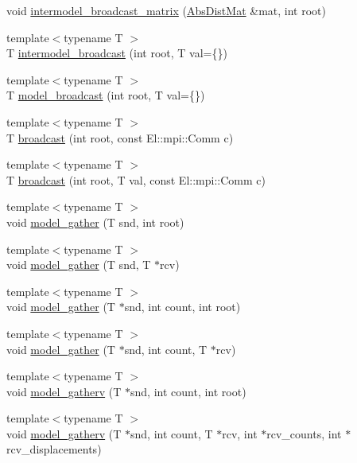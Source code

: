 \begin{DoxyCompactItemize}
void \hyperlink{classlbann_1_1lbann__comm_a7fb6be066a634169cb41cef3f98032f0}{intermodel\+\_\+broadcast\+\_\+matrix} (\hyperlink{base_8hpp_a9a697a504ae84010e7439ffec862b470}{Abs\+Dist\+Mat} \&mat, int root)
\item 
{\footnotesize template$<$typename T $>$ }\\T \hyperlink{classlbann_1_1lbann__comm_a158db6a85549d314be56806dcb442432}{intermodel\+\_\+broadcast} (int root, T val=\{\})
\item 
{\footnotesize template$<$typename T $>$ }\\T \hyperlink{classlbann_1_1lbann__comm_a929f44a9a9563ae9e4ffe7d44235a195}{model\+\_\+broadcast} (int root, T val=\{\})
\item 
{\footnotesize template$<$typename T $>$ }\\T \hyperlink{classlbann_1_1lbann__comm_af823b7ca3caccbd0710cd1435e60506b}{broadcast} (int root, const El\+::mpi\+::\+Comm c)
\item 
{\footnotesize template$<$typename T $>$ }\\T \hyperlink{classlbann_1_1lbann__comm_a34bb0766e57fda27e6618c9e66fec269}{broadcast} (int root, T val, const El\+::mpi\+::\+Comm c)
\item 
{\footnotesize template$<$typename T $>$ }\\void \hyperlink{classlbann_1_1lbann__comm_ab7cdeca37f1fcd22a3b69f6134fb299f}{model\+\_\+gather} (T snd, int root)
\item 
{\footnotesize template$<$typename T $>$ }\\void \hyperlink{classlbann_1_1lbann__comm_a54ee25dd95d57c0781ac0aa84d30ab8b}{model\+\_\+gather} (T snd, T $\ast$rcv)
\item 
{\footnotesize template$<$typename T $>$ }\\void \hyperlink{classlbann_1_1lbann__comm_ab3d868497325882372e1a8d9f878cd2f}{model\+\_\+gather} (T $\ast$snd, int count, int root)
\item 
{\footnotesize template$<$typename T $>$ }\\void \hyperlink{classlbann_1_1lbann__comm_adc1c96023f4546d57f0a85e905d070b4}{model\+\_\+gather} (T $\ast$snd, int count, T $\ast$rcv)
\item 
{\footnotesize template$<$typename T $>$ }\\void \hyperlink{classlbann_1_1lbann__comm_a9d4eeae3b7ed19d48e95fc3f7138885b}{model\+\_\+gatherv} (T $\ast$snd, int count, int root)
\item 
{\footnotesize template$<$typename T $>$ }\\void \hyperlink{classlbann_1_1lbann__comm_a2752b91d60548d15320d5808d8c523d2}{model\+\_\+gatherv} (T $\ast$snd, int count, T $\ast$rcv, int $\ast$rcv\+\_\+counts, int $\ast$rcv\+\_\+displacements)

\end{DoxyCompactItemize}
